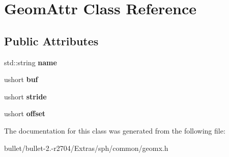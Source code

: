 \hypertarget{class_geom_attr}{\section{Geom\+Attr Class Reference}
\label{class_geom_attr}
}
\subsection*{Public Attributes}
\begin{DoxyCompactItemize}
\item 
\hypertarget{class_geom_attr_a77c22327fc4e9f9c806450b89ad06f8d}{std\+::string {\bfseries name}}\label{class_geom_attr_a77c22327fc4e9f9c806450b89ad06f8d}

\item 
\hypertarget{class_geom_attr_a5028ef156de890a241dc8a817e106e50}{ushort {\bfseries buf}}\label{class_geom_attr_a5028ef156de890a241dc8a817e106e50}

\item 
\hypertarget{class_geom_attr_a43df66aecceb10ecffc5e4d6e39e96c6}{ushort {\bfseries stride}}\label{class_geom_attr_a43df66aecceb10ecffc5e4d6e39e96c6}

\item 
\hypertarget{class_geom_attr_a03535ca30ccc70ce33b3cca1c6c61be0}{ushort {\bfseries offset}}\label{class_geom_attr_a03535ca30ccc70ce33b3cca1c6c61be0}

\end{DoxyCompactItemize}


The documentation for this class was generated from the following file\+:\begin{DoxyCompactItemize}
\item 
bullet/bullet-\/2.-\/r2704/\+Extras/sph/common/geomx.\+h\end{DoxyCompactItemize}
